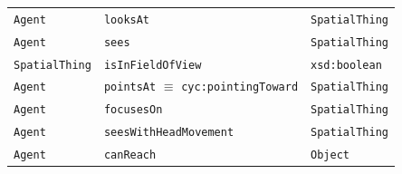 \documentclass[xcolor=table]{beamer}
\newcommand{\concept}[1]{{\scriptsize \texttt{#1}}}
\begin{document}
{\begin{frame}{}
\begin{tabular}{p{1.5cm}lp{2cm}}
            \hline
            \concept{Agent}  & \concept{looksAt}  & \concept{SpatialThing} \\
            \concept{Agent}  & \concept{sees}  &  \concept{SpatialThing}  \\ 
            \concept{SpatialThing}  & \concept{isInFieldOfView}  & \concept{xsd:boolean}  \\ 
            \concept{Agent}  & \concept{pointsAt} $\equiv$ \concept{cyc:pointingToward}  & \concept{SpatialThing} \\ 
            \concept{Agent}  & \concept{focusesOn}  &  \concept{SpatialThing}  \\ 
            \concept{Agent} & \concept{seesWithHeadMovement} &  \concept{SpatialThing} \\
            \concept{Agent} & \concept{canReach} &  \concept{Object} \\ 

        \end{tabular}

\end{frame}
}
\end{document}
